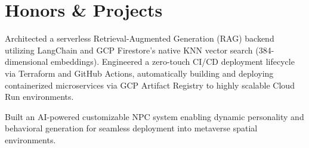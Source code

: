 \section{Honors \& Projects}

\begin{resumeitems}
  \item Architected a serverless Retrieval-Augmented Generation (RAG) backend utilizing LangChain and GCP Firestore's native KNN vector search (384-dimensional embeddings). Engineered a zero-touch CI/CD deployment lifecycle via Terraform and GitHub Actions, automatically building and deploying containerized microservices via GCP Artifact Registry to highly scalable Cloud Run environments.
\end{resumeitems}

\begin{resumeitems}
  \item Built an AI-powered customizable NPC system enabling dynamic personality and behavioral generation for seamless deployment into metaverse spatial environments.
\end{resumeitems}
